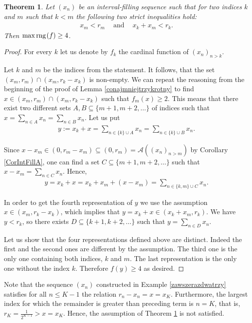 \documentclass{amsart}
\newtheorem{theorem}{Theorem}[section]
\theoremstyle{definition}
\newcommand{\rng}{{\rm rng} \hspace{0.03cm}}
\begin{document}
\begin{theorem}\label{dwieostre}
Let $(x_n)$ be an interval-filling sequence such that for two  indices $k$ and $m$ such that $k<m$ the following two strict inequalities hold:
\begin{align*}
x_{m} < r_{m} \ \ \ \ \textrm{ and } \ \ \ \ x_k+x_m<r_k.
\end{align*}
Then $\max \rng(f)\geq 4$. 
\end{theorem}
\begin{proof}
For every $k$ let us denote by $f_{k}$ the cardinal function of $(x_{n})_{n>k}$.

Let $k$ and $m$ be the indices from the statement. It follows, that the set $(x_m,r_m)\cap (x_m,r_k-x_k)$ is non-empty. We can repeat the reasoning from the beginning of the proof of Lemma \ref{conajmniejtrzykrotny} to find $x\in (x_m,r_m)\cap (x_m,r_k-x_k)$ such that $f_{m}(x)\geq 2$. This means that there exist two different sets $A,B\subseteq\{m+1,m+2,\ldots\}$ of indices such that $x=\sum_{n\in A}x_n=\sum_{n\in B}x_n$. Let us put
\begin{align*}
y:=x_k+x=\sum_{n\in \{k\}\cup A}x_n=\sum_{n\in \{k\}\cup B}x_n.
\end{align*}

Since $x-x_m\in(0,r_m-x_m)\subseteq (0,r_m)=\mathcal{A}((x_{n})_{n>m})$ by Corollary \ref{CorIntFillA}, one can find a set $C\subseteq\{m+1,m+2,\ldots\}$ such that $x-x_m=\sum_{n\in C}x_n$. Hence,
\begin{align*}
y=x_k+x=x_k+x_m+(x-x_m)=\sum_{n\in \{k,m\}\cup C}x_n.
\end{align*}

 
In order to get the fourth representation of $y$ we use the assumption $x\in (x_m,r_k-x_k)$, which implies that $y=x_k+x\in (x_k+x_m,r_k)$. We have $y<r_k$, so there exists $D\subseteq\{k+1,k+2,\ldots\}$ such that $y=\sum_{n\in D}x_n$.

Let us show that the four representations defined above are distinct. Indeed the first and the second ones are different by the assumption. The third one is the only one containing both indices, $k$ and $m$. The last representation is the only one without the index $k$. Therefore $f(y)\geq 4$ as desired.
\end{proof}

Note that the sequence $(x_{n})$ constructed in Example \ref{zawszerazdwatrzy} satisfies for all $n\leq K-1$ the relation $r_n-x_n=x=x_K$. Furthermore, the largest index for which the remainder is greater than preceding term is $n=K$, that is, $r_K=\frac{1}{2^{K-1}}>x=x_K$.  Hence, the assumption of Theorem \ref{dwieostre} is not satisfied.
\end{document}
